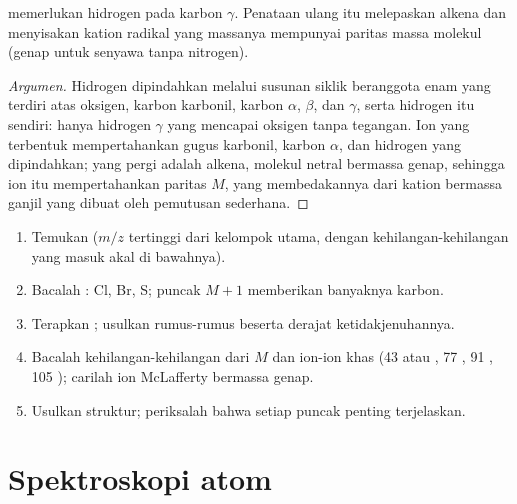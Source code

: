 \begin{proposition}\label{prop:b2:mass-spec-atomic:mclafferty}
 memerlukan hidrogen pada karbon $\gamma$. Penataan
ulang itu melepaskan alkena dan menyisakan kation radikal yang massanya
mempunyai paritas massa molekul (genap untuk senyawa tanpa nitrogen).
\end{proposition}

\begin{proof}[Argumen]
Hidrogen dipindahkan melalui susunan siklik beranggota enam yang terdiri
atas oksigen, karbon karbonil, karbon $\alpha$, $\beta$, dan $\gamma$, serta
hidrogen itu sendiri: hanya hidrogen $\gamma$ yang mencapai oksigen tanpa
tegangan. Ion yang terbentuk mempertahankan gugus karbonil, karbon $\alpha$,
dan hidrogen yang dipindahkan; yang pergi adalah alkena, molekul netral
bermassa genap, sehingga ion itu mempertahankan paritas $M$, yang
membedakannya dari kation bermassa ganjil yang dibuat oleh pemutusan
sederhana.
\end{proof}

\begin{method}\label{met:b2:mass-spec-atomic:read-ms}
\begin{enumerate}
  \item Temukan  ($m/z$ tertinggi dari kelompok utama, dengan
        kehilangan-kehilangan yang masuk akal di bawahnya).
  \item Bacalah : Cl, Br, S; puncak $M+1$ memberikan banyaknya karbon.
  \item Terapkan ; usulkan rumus-rumus beserta derajat ketidakjenuhannya.
  \item Bacalah kehilangan-kehilangan dari $M$ dan ion-ion khas (43  atau , 77
        , 91 , 105 ); carilah ion McLafferty bermassa genap.
  \item Usulkan struktur; periksalah bahwa setiap puncak penting terjelaskan.
\end{enumerate}
\end{method}

\section{Spektroskopi atom}

